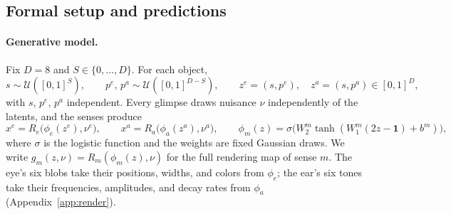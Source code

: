 \documentclass[11pt]{article}
\begin{document}
\subsection{Formal setup and predictions}
\label{sec:formal}

\paragraph{Generative model.} Fix $D=8$ and $S\in\{0,\dots,D\}$. For each object,
\begin{equation}
  s\sim\mathcal U([0,1]^S),\qquad p^{e},\,p^{a}\sim\mathcal U([0,1]^{D-S}),\qquad
  z^{e}=(s,p^{e}),\quad z^{a}=(s,p^{a})\in[0,1]^D,
  \label{eq:latents}
\end{equation}
with $s$, $p^{e}$, $p^{a}$ independent. Every glimpse draws nuisance $\nu$ independently of the latents, and the senses produce
\begin{equation}
  x^{e}=R_{e}\big(\phi_{e}(z^{e}),\nu^{e}\big),\qquad x^{a}=R_{a}\big(\phi_{a}(z^{a}),\nu^{a}\big),
  \qquad \phi_m(z)=\sigma\!\big(W^m_2\tanh(W^m_1(2z-\mathbf 1)+b^m)\big),
  \label{eq:render}
\end{equation}
where $\sigma$ is the logistic function and the weights are fixed Gaussian draws. We write $g_m(z,\nu)=R_m(\phi_m(z),\nu)$ for the full rendering map of sense $m$. The eye's six blobs take their positions, widths, and colors from $\phi_e$; the ear's six tones take their frequencies, amplitudes, and decay rates from $\phi_a$ (Appendix~\ref{app:render}).
\end{document}
